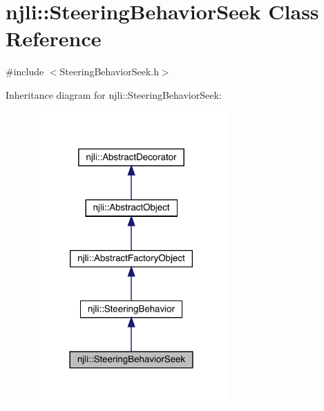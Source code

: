 \hypertarget{classnjli_1_1_steering_behavior_seek}{}\section{njli\+:\+:Steering\+Behavior\+Seek Class Reference}
\label{classnjli_1_1_steering_behavior_seek}


{\ttfamily \#include $<$Steering\+Behavior\+Seek.\+h$>$}



Inheritance diagram for njli\+:\+:Steering\+Behavior\+Seek\+:\nopagebreak
\begin{figure}[H]
\begin{center}
\leavevmode
\includegraphics[width=213pt]{classnjli_1_1_steering_behavior_seek__inherit__graph}
\end{center}
\end{figure}



